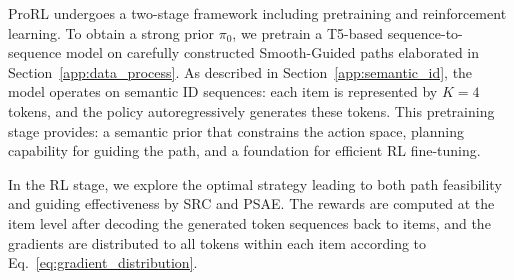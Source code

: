 \documentclass{llmxive}
\begin{document}
ProRL undergoes a two-stage framework including pretraining and reinforcement learning. To obtain a strong prior $\pi_0$, we pretrain a T5-based sequence-to-sequence model on carefully constructed Smooth-Guided paths elaborated in Section~\ref{app:data_process}. As described in Section~\ref{app:semantic_id}, the model operates on semantic ID sequences: each item is represented by $K=4$ tokens, and the policy autoregressively generates these tokens. This pretraining stage provides: a semantic prior that constrains the action space, planning capability for guiding the path, and a foundation for efficient RL fine-tuning.

In the RL stage, we explore the optimal strategy leading to both path feasibility and guiding effectiveness by SRC and PSAE. The rewards are computed at the item level after decoding the generated token sequences back to items, and the gradients are distributed to all tokens within each item according to Eq.~\eqref{eq:gradient_distribution}.
\end{document}

